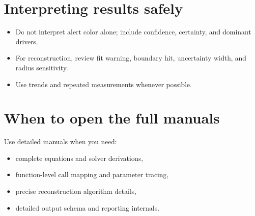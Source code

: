 \documentclass[12pt,a4paper]{article}
\begin{document}
\section{Interpreting results safely}
\begin{itemize}
    \item Do not interpret alert color alone; include confidence, certainty, and dominant drivers.
    \item For reconstruction, review fit warning, boundary hit, uncertainty width, and radius sensitivity.
    \item Use trends and repeated measurements whenever possible.
\end{itemize}

\section{When to open the full manuals}
Use detailed manuals when you need:
\begin{itemize}
    \item complete equations and solver derivations,
    \item function-level call mapping and parameter tracing,
    \item precise reconstruction algorithm details,
    \item detailed output schema and reporting internals.
\end{itemize}
\end{document}
